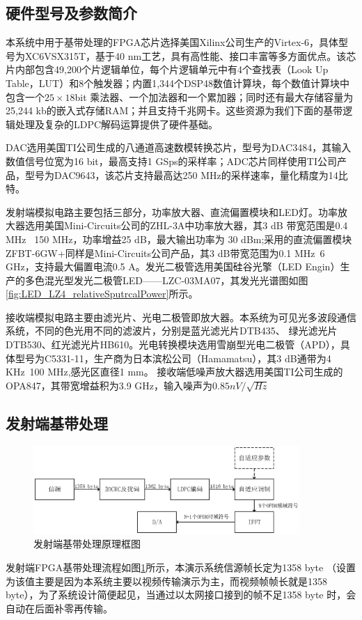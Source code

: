 \subsection{硬件型号及参数简介}
本系统中用于基带处理的FPGA芯片选择美国Xilinx公司生产的Virtex-6，具体型号为XC6VSX315T，基于40 nm工艺，具有高性能、接口丰富等多方面优点。该芯片内部包含49,200个片逻辑单位，每个片逻辑单元中有4个查找表（Look Up Table，LUT）和8个触发器；内置1,344个DSP48数值计算块，每个数值计算块中包含一个$25\times 18$bit 乘法器、一个加法器和一个累加器；同时还有最大存储容量为25,244 kb的嵌入式存储RAM；并且支持千兆网卡\cite{FPGAIntroduciton}。这些资源为我们下面的基带逻辑处理及复杂的LDPC解码运算提供了硬件基础。

DAC选用美国TI公司生成的八通道高速数模转换芯片，型号为DAC3484，其输入数值信号位宽为16 bit，最高支持1 GSps的采样率；ADC芯片同样使用TI公司产品，型号为DAC9643，该芯片支持最高达250 MHz的采样速率，量化精度为14比特。

发射端模拟电路主要包括三部分，功率放大器、直流偏置模块和LED灯。功率放大器选用美国Mini-Circuits公司的ZHL-3A中功率放大器，其3 dB 带宽范围是0.4 MHz ~150 MHz，功率增益25 dB，最大输出功率为 30 dBm;采用的直流偏置模块ZFBT-6GW+同样是Mini-Circuits公司产品，其3 dB带宽范围为0.1 MHz~6 GHz，支持最大偏置电流0.5 A。发光二极管选用美国硅谷光擎（LED Engin）生产的多色混光型发光二极管LED——LZC-03MA07，其发光光谱图如图\ref{fig:LED_LZ4_relativeSputrcalPower}所示。

接收端模拟电路主要由滤光片、光电二极管即放大器。本系统为可见光多波段通信系统，不同的色光用不同的滤波片，分别是蓝光滤光片DTB435、 绿光滤光片DTB530、红光滤光片HB610。光电转换模块选用雪崩型光电二极管（APD），具体型号为C5331-11，生产商为日本滨松公司（Hamamatsu），其3 dB通带为4 KHz~100 MHz,感光区直径1 mm。 接收端低噪声放大器选用美国TI公司生成的OPA847，其带宽增益积为3.9 GHz，输入噪声为$0.85 nV/\sqrt{Hz}$
\subsection{发射端基带处理}
\begin{figure}[htbp]
\centering
\includegraphics[width=0.9\textwidth]{figures/chapter-5/TransmitterSchematic.eps}
\caption{发射端基带处理原理框图}
\label{fig:TransmitterSchematic}
\end{figure}
发射端FPGA基带处理流程如图\ref{fig:TransmitterSchematic}所示，本演示系统信源帧长定为1358 byte （设置为该值主要是因为本系统主要以视频传输演示为主，而视频帧帧长就是1358 byte），为了系统设计简便起见，当通过以太网接口接到的帧不足1358 byte 时，会自动在后面补零再传输。

